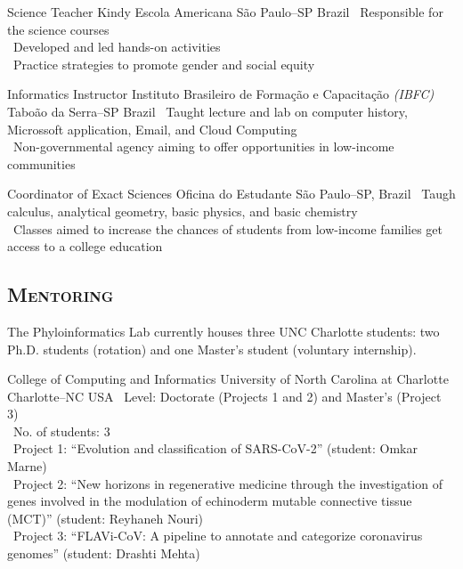 \documentclass[11pt, letterpaper, sans]{moderncv}
\begin{document}
	{Science Teacher}
	{Kindy Escola Americana}
	{São Paulo--SP}
	{Brazil}
	{
		\textbullet~Responsible for the science courses\\
		\textbullet~Developed and led hands-on activities\\
		\textbullet~Practice strategies to promote gender and social equity
	}

\vspace{.5em}

	{Informatics Instructor}
	{Instituto Brasileiro de Formação e Capacitação \emph{(IBFC)}}
	{Taboão da Serra--SP}
	{Brazil}
	{
		\textbullet~Taught lecture and lab  on computer history, Microssoft application, Email, and Cloud Computing\\
		\textbullet~Non-governmental agency aiming to offer opportunities in low-income communities
	}

\vspace{.5em}

	{Coordinator of Exact Sciences}
	{Oficina do Estudante}
	{São Paulo--SP, Brazil}
	{}
	{
		\textbullet~Taugh calculus, analytical geometry, basic physics, and basic chemistry\\
		\textbullet~Classes aimed to increase the chances of students from low-income families get access to a college education
	}

\vspace{.5em}
\subsection{\textsc{Mentoring}}
\vspace{.5em}

The Phyloinformatics Lab currently houses three UNC Charlotte students: two Ph.D. students (rotation) and one Master's student (voluntary internship).

\vspace{.5em}

{College of Computing and Informatics}
{University of North Carolina at Charlotte}
{Charlotte--NC}
{USA}
{
	\textbullet~Level: Doctorate (Projects 1 and 2) and Master's (Project 3)\\
	\textbullet~No. of students: 3\\
	\textbullet~Project 1: ``Evolution and classification of SARS-CoV-2'' (student: Omkar Marne)\\
	\textbullet~Project 2: ``New horizons in regenerative medicine through the investigation of genes
involved in the modulation of echinoderm mutable connective tissue (MCT)'' (student: Reyhaneh Nouri)\\
	\textbullet~Project 3: ``FLAVi-CoV: A pipeline to annotate and categorize coronavirus genomes'' (student: Drashti Mehta)\\
}
\end{document}
